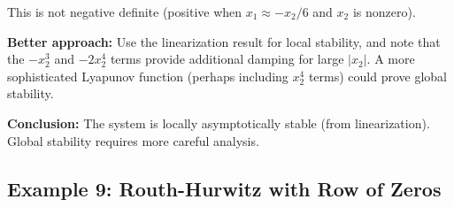 \begin{example}
This is not negative definite (positive when $x_1 \approx -x_2/6$ and $x_2$ is nonzero).

\textbf{Better approach:} Use the linearization result for local stability, and note that the $-x_2^3$ and $-2x_2^4$ terms provide additional damping for large $|x_2|$. A more sophisticated Lyapunov function (perhaps including $x_2^4$ terms) could prove global stability.

\textbf{Conclusion:} The system is locally asymptotically stable (from linearization). Global stability requires more careful analysis.
\end{example}

\subsection{Example 9: Routh-Hurwitz with Row of Zeros}

